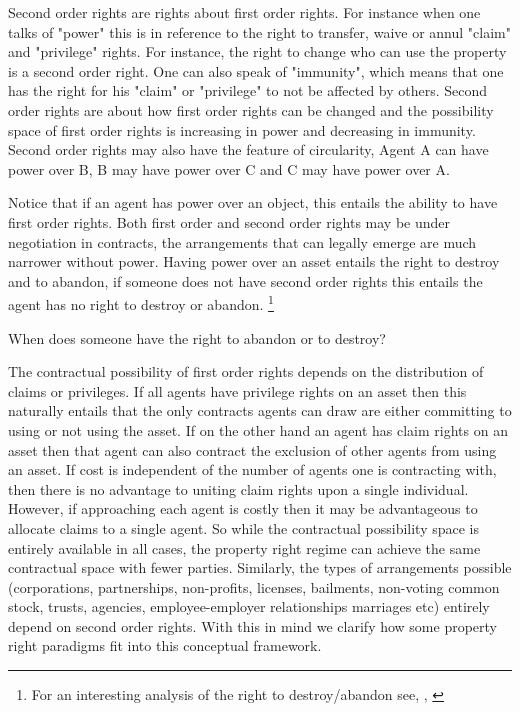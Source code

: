 \documentclass[12pt]{report}
\numberwithin{equation}{section}
\begin{document}
Second order rights are rights about first order rights. For instance when one talks of "power" this is in reference to the right to transfer, waive or annul "claim" and "privilege" rights. For instance, the right to change who can use the property is a second order right. One can also speak of "immunity", which means that one has the right for his "claim" or "privilege" to not be affected by others. Second order rights are about how first order rights can be changed and the possibility space of first order rights is increasing in power and decreasing in immunity. Second order rights may also have the feature of circularity, Agent A can have power over B, B may have power over C and C may have power over A.

Notice that if an agent has power over an object, this entails the ability to have first order rights. Both first order and second order rights may be under negotiation in contracts, the arrangements that can legally emerge are much narrower without power. Having power over an asset entails the right to destroy and to abandon, if someone does not have second order rights this entails the agent has no right to destroy or abandon. \footnote{For an interesting analysis of the right to destroy/abandon see, \cite{Strahilevitz2005}, \cite{Strahilevitz2009}}

When does someone have the right to abandon or to destroy? 

The contractual possibility of first order rights depends on the distribution of claims or privileges. If all agents have privilege rights on an asset then this naturally entails that the only contracts agents can draw are either committing to using or not using the asset. If on the other hand an agent has claim rights on an asset then that agent can also contract the exclusion of other agents from using an asset. If cost is independent of the number of agents one is contracting with, then there is no advantage to uniting claim rights upon a single individual. However, if approaching each agent is costly then it may be advantageous to allocate claims to a single agent. So while the contractual possibility space is entirely available in all cases, the property right regime can achieve the same contractual space with fewer parties. Similarly, the types of arrangements possible (corporations, partnerships, non-profits, licenses, bailments, non-voting common stock, trusts, agencies, employee-employer relationships marriages etc) entirely depend on second order rights. With this in mind we clarify how some property right paradigms fit into this conceptual framework.
\end{document}
